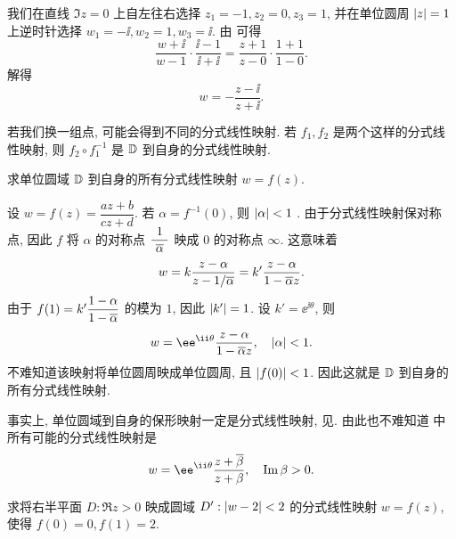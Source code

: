\begin{solution}
  我们在直线 $\Im z=0$ 上自左往右选择 $z_1=-1,z_2=0,z_3=1$, 并在单位圆周 $\left|z\right|=1$ 上逆时针选择 $w_1=-\ii,w_2=1,w_3=\ii$.
  由 可得
  \[
     \frac{w+\ii}{w-1}\cdot\frac{\ii-1}{\ii+\ii}
    =\frac{z+1}{z-0}\cdot\frac{1+1}{1-0}.
  \]
  解得
  \[
    w=-\dfrac{z-\ii}{z+\ii}.
  \]
\end{solution}

若我们换一组点, 可能会得到不同的分式线性映射.
若 $f_1,f_2$ 是两个这样的分式线性映射, 则 $f_2\circ f_1^{-1}$ 是 ${\mathbb{D}}$ 到自身的分式线性映射.

\begin{example}
  求单位圆域 ${\mathbb{D}}$ 到自身的所有分式线性映射 $w=f(z)$.
\end{example}

\begin{solution}
  设 $w=f(z)=\dfrac{az+b}{cz+d}$. \smallskip 
  若 $\alpha=f^{-1}(0)$, 则 $\left|\alpha\right|<1$ .
  由于分式线性映射保对称点, 因此 $f$ 将 $\alpha$ 的对称点 $\dfrac1{~\overline\alpha~}$ 映成 $0$ 的对称点 $\infty$.
  这意味着
  \[
    w=k\frac{z-\alpha}{z-1/\overline\alpha}=k'\frac{z-\alpha}{1-\overline\alpha z}.
  \]
  由于 $f(1)=k'\dfrac{1-\alpha}{1-\overline\alpha}$ 的模为 $1$, 因此 $\left|k'\right|=1$.
  设 $k'=\ee^{\ii\theta}$, 则
  \[
    w=\ee^{\ii\theta}\frac{z-\alpha}{1-\ov\alpha z},\quad \abs{\alpha}<1.
  \]
  不难知道该映射将单位圆周映成单位圆周, 且 $\left|f(0)\right|<1$.
  因此这就是 ${\mathbb{D}}$ 到自身的所有分式线性映射.
\end{solution}

事实上, 单位圆域到自身的保形映射一定是分式线性映射, 见.
由此也不难知道 中所有可能的分式线性映射是
\begin{equation}
  \label{eq:coformal-h-to-d}
  w=\ee^{\ii\theta}\dfrac{z+\ov\beta}{z+\beta},\quad\Im\beta>0.
\end{equation}

\begin{example}
  求将右半平面 $D:\Re z>0$ 映成圆域 $D':\left|w-2\right|<2$ 的分式线性映射 $w=f(z)$, 使得 $f(0)=0,f(1)=2$.
\end{example}

